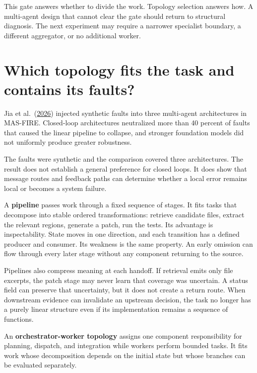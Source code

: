 This gate answers whether to divide the work. Topology selection answers how. A multi-agent design that cannot clear the gate should return to structural diagnosis. The next experiment may require a narrower specialist boundary, a different aggregator, or no additional worker.

\hypertarget{which-topology-fits-the-task-and-contains-its-faults}{%
\section{Which topology fits the task and contains its faults?}\label{which-topology-fits-the-task-and-contains-its-faults}}

Jia et al.~(\href{https://arxiv.org/abs/2602.19843}{2026}) injected synthetic faults into three multi-agent architectures in MAS-FIRE. Closed-loop architectures neutralized more than 40 percent of faults that caused the linear pipeline to collapse, and stronger foundation models did not uniformly produce greater robustness.

The faults were synthetic and the comparison covered three architectures. The result does not establish a general preference for closed loops. It does show that message routes and feedback paths can determine whether a local error remains local or becomes a system failure.

A \textbf{pipeline} passes work through a fixed sequence of stages. It fits tasks that decompose into stable ordered transformations: retrieve candidate files, extract the relevant regions, generate a patch, run the tests. Its advantage is inspectability. State moves in one direction, and each transition has a defined producer and consumer. Its weakness is the same property. An early omission can flow through every later stage without any component returning to the source.

Pipelines also compress meaning at each handoff. If retrieval emits only file excerpts, the patch stage may never learn that coverage was uncertain. A status field can preserve that uncertainty, but it does not create a return route. When downstream evidence can invalidate an upstream decision, the task no longer has a purely linear structure even if its implementation remains a sequence of functions.

An \textbf{orchestrator-worker topology} assigns one component responsibility for planning, dispatch, and integration while workers perform bounded tasks. It fits work whose decomposition depends on the initial state but whose branches can be evaluated separately.

